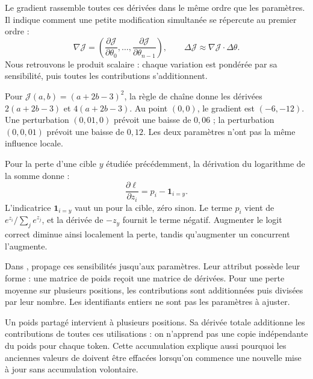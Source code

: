 Le gradient rassemble toutes ces dérivées dans le même ordre
que les paramètres. Il indique comment une petite modification
simultanée se répercute au premier ordre :
\[
 \nabla\mathcal{J}=
 \left(\frac{\partial\mathcal{J}}{\partial\theta_0},
 \ldots,\frac{\partial\mathcal{J}}{\partial\theta_{n-1}}\right),
 \qquad
 \Delta\mathcal{J}\approx\nabla\mathcal{J}\cdot\Delta\theta.
\]
Nous retrouvons le produit scalaire : chaque variation est
pondérée par sa sensibilité, puis toutes les contributions
s'additionnent.

Pour \(\mathcal{J}(a,b)=(a+2b-3)^2\), la règle de chaîne
donne les dérivées \(2(a+2b-3)\) et \(4(a+2b-3)\).
Au point \((0,0)\), le gradient est \((-6,-12)\).
Une perturbation \((0{,}01,0)\) prévoit une baisse de
\(0{,}06\) ; la perturbation \((0,0{,}01)\) prévoit
une baisse de \(0{,}12\). Les deux paramètres n'ont pas
la même influence locale.

Pour la perte d'une cible \(y\) étudiée précédemment,
la dérivation du logarithme de la somme donne :
\[
 \frac{\partial\ell}{\partial z_i}
 =p_i-\mathbf{1}_{i=y}.
\]
L'indicatrice \(\mathbf{1}_{i=y}\) vaut un pour la cible,
zéro sinon. Le terme \(p_i\) vient de
\(e^{z_i}/\sum_j e^{z_j}\), et la dérivée de \(-z_y\)
fournit le terme négatif. Augmenter le logit correct diminue
ainsi localement la perte, tandis qu'augmenter un concurrent
l'augmente.

Dans ,  propage ces
sensibilités jusqu'aux paramètres. Leur attribut 
possède leur forme : une matrice de poids reçoit une matrice
de dérivées. Pour une perte moyenne sur plusieurs positions,
les contributions sont additionnées puis divisées par leur nombre.
Les identifiants entiers ne sont pas les paramètres à ajuster.

Un poids partagé intervient à plusieurs positions. Sa dérivée
totale additionne les contributions de toutes ces utilisations :
on n'apprend pas une copie indépendante du poids pour chaque
token. Cette accumulation explique aussi pourquoi les anciennes
valeurs de  doivent être effacées lorsqu'on commence
une nouvelle mise à jour sans accumulation volontaire.


